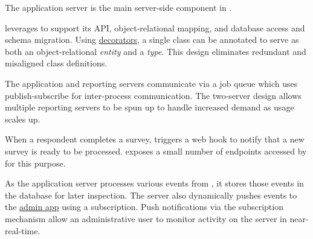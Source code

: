 \documentclass{article}
\begin{document}
The application server is the main server-side component in \caper.

\caper{} leverages \nest{}
to support its
\gql{} API,
\typeorm{} object-relational mapping, and
\pg{} database access and schema migration.
Using \ts{}
\href{https://www.typescriptlang.org/docs/handbook/decorators.html}{decorators},
a single class
can be annotated to serve as both
an object-relational \emph{entity}
and a \gql{} \emph{type}.
This design eliminates redundant and misaligned class definitions.

The application and reporting servers
communicate via a \bull{} job queue
which uses \redis{} publish-subscribe
for inter-process communication.
The two-server design allows multiple reporting servers to be spun up
to handle increased demand as usage scales up.

When a respondent completes a survey,
\qual{} triggers a web hook
to notify \caper{} that a new survey
is ready to be processed.
\caper{}
exposes a small number of \rest{} endpoints
accessed by \qual{} for this purpose.

As the application server processes various events from \qual,
it stores those events in the database for later inspection.
The server also dynamically pushes events to the
\hyperref[sec:admin-app]{admin app}
using a \gql{} subscription.
Push notifications via the subscription mechanism
allow an administrative user
to monitor activity on the \caper{} server
in near-real-time.
\end{document}
